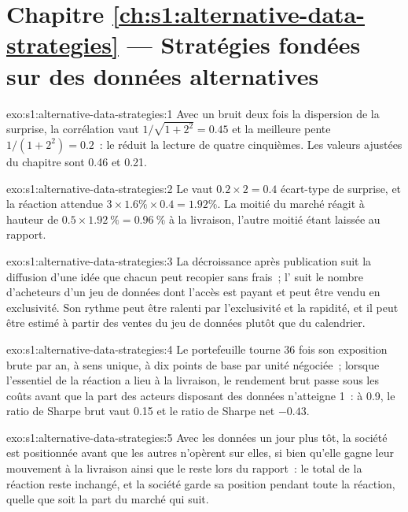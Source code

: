\section*{Chapitre \ref{ch:s1:alternative-data-strategies} --- Stratégies fondées sur des données alternatives}

\begin{solution}{exo:s1:alternative-data-strategies:1}
Avec un bruit deux fois la dispersion de la surprise, la corrélation vaut $1/\sqrt{1 + 2^2} = 0.45$ et la meilleure pente $1/(1 + 2^2) = 0.2$~: le  réduit la lecture
de quatre cinquièmes. Les valeurs ajustées du chapitre sont 0.46 et 0.21.
\end{solution}

\begin{solution}{exo:s1:alternative-data-strategies:2}
Le  vaut $0.2 \times 2 = 0.4$ écart-type de surprise, et la réaction attendue $3 \times 1.6\% \times 0.4 = 1.92\%$. La moitié du marché réagit
à hauteur de $0.5 \times 1.92~\% = 0.96~\%$ à la livraison, l'autre moitié étant laissée au rapport.
\end{solution}

\begin{solution}{exo:s1:alternative-data-strategies:3}
La décroissance après publication suit la diffusion d'une idée que chacun peut recopier sans frais~; l' suit le nombre d'acheteurs d'un jeu de données dont l'accès est payant
et peut être vendu en exclusivité. Son rythme peut être ralenti par l'exclusivité et la rapidité, et il peut être estimé à partir des ventes du jeu de données plutôt que du calendrier.
\end{solution}

\begin{solution}{exo:s1:alternative-data-strategies:4}
Le portefeuille tourne 36 fois son exposition brute par an, à sens unique, à dix points de base par unité négociée~; lorsque l'essentiel de la réaction a lieu à la livraison, le rendement brut passe sous les
coûts avant que la part des acteurs disposant des données n'atteigne 1~: à 0.9, le ratio de Sharpe brut vaut 0.15 et le ratio de Sharpe net $-0.43$.
\end{solution}

\begin{solution}{exo:s1:alternative-data-strategies:5}
Avec les données un jour plus tôt, la société est positionnée avant que les autres n'opèrent sur elles, si bien qu'elle gagne leur mouvement à la livraison ainsi que le reste lors du rapport~:
le total de la réaction reste inchangé, et la société garde sa position pendant toute la réaction, quelle que soit la part du marché qui suit.
\end{solution}

